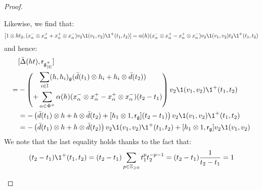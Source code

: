 \begin{proof}
\begin{enumerate}
\begin{enumerate}
                        Likewise, we find that:
                            $$[1 \tensor h t_2, (x_{\alpha}^- \tensor x_{\alpha}^+ + x_{\alpha}^+ \tensor x_{\alpha}^-) v_2\1(v_1, v_2) \1^+(t_1, t_2)] = \alpha(h) ( x_{\alpha}^- \tensor x_{\alpha}^+ - x_{\alpha}^+ \tensor x_{\alpha}^- ) v_2 \1(v_1, v_2) t_2 \1^+(t_1, t_2)$$
                        and hence:
                            $$
                                \begin{aligned}
                                    & [\bar{\Delta}(ht), \sfr_{\g_{[2]}^{\positive}}]
                                    \\
                                    = &
                                    -\left(
                                    \begin{aligned}
                                        & \sum_{i \in \simpleroots} (h, h_i)_{\g} ( \bar{d}(t_1) \tensor h_i + h_i \tensor \bar{d}(t_2) )
                                        \\
                                        + & \sum_{\alpha \in \Phi^+} \alpha(h) ( x_{\alpha}^- \tensor x_{\alpha}^+ - x_{\alpha}^+ \tensor x_{\alpha}^- )(t_2 - t_1)
                                    \end{aligned}
                                    \right) v_2 \1(v_1, v_2) \1^+(t_1, t_2)
                                    \\
                                    & = -\left( \bar{d}(t_1) \tensor h + h \tensor \bar{d}(t_2) + [h_1 \tensor 1, \sfr_{\g}] (t_2 - t_1) \right) v_2 \1(v_1, v_2) \1^+(t_1, t_2)
                                    \\
                                    & = -\left( \bar{d}(t_1) \tensor h + h \tensor \bar{d}(t_2) \right) v_2 \1(v_1, v_2) \1^+(t_1, t_2) + [h_1 \tensor 1, \sfr_{\g}] v_2 \1(v_1, v_2)
                                \end{aligned}
                            $$
                        We note that the last equality holds thanks to the fact that:
                            $$(t_2 - t_1) \1^+(t_1, t_2) = (t_2 - t_1) \sum_{p \in \Z_{\geq 0}} t_1^p t_2^{-p - 1} = (t_2 - t_1) \frac{1}{t_2 - t_1} = 1$$
                            

\end{enumerate}
\end{enumerate}
\end{proof}
